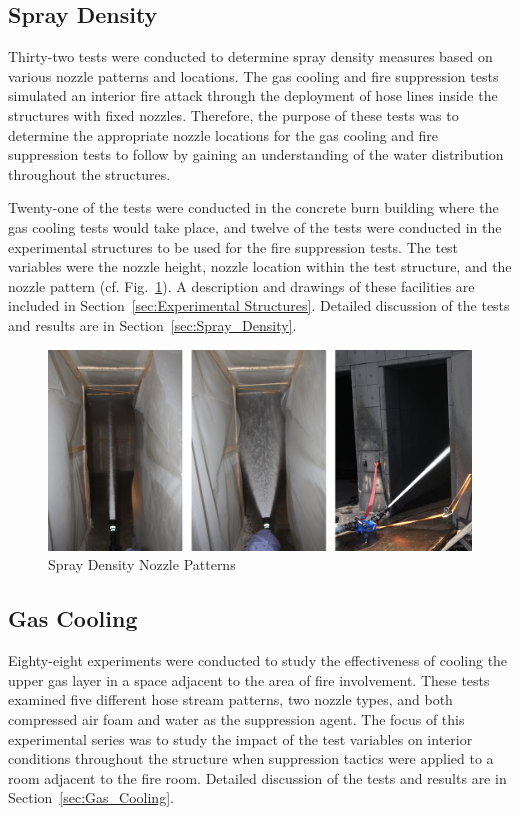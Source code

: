 \documentclass[12pt,oneside]{book}
\begin{document}
\subsection{Spray Density}
\label{sec:desc_Spray_Density}

Thirty-two tests were conducted to determine spray density measures based on various nozzle patterns and locations. The gas cooling and fire suppression tests simulated an interior fire attack through the deployment of hose lines inside the structures with fixed nozzles. Therefore, the purpose of these tests was to determine the appropriate nozzle locations for the gas cooling and fire suppression tests to follow by gaining an understanding of the water distribution throughout the structures.

Twenty-one of the tests were conducted in the concrete burn building where the gas cooling tests would take place, and twelve of the tests were conducted in the experimental structures to be used for the fire suppression tests. The test variables were the nozzle height, nozzle location within the test structure, and the nozzle pattern (cf. Fig.~\ref{fig:Spray_Density_Nozzle_Patterns}). A description and drawings of these facilities are included in Section~\ref{sec:Experimental Structures}. Detailed discussion of the tests and results are in Section~\ref{sec:Spray_Density}.

\begin{figure}[!ht]
	\includegraphics[width=6in]{../Figures/Pictures/Flows}
	\caption{Spray Density Nozzle Patterns}
	\label{fig:Spray_Density_Nozzle_Patterns}
\end{figure}

\subsection{Gas Cooling}
\label{sec:desc_Gas_Cooling}

Eighty-eight experiments were conducted to study the effectiveness of cooling the upper gas layer in a space adjacent to the area of fire involvement. These tests examined five different hose stream patterns, two nozzle types, and both compressed air foam and water as the suppression agent. The focus of this experimental series was to study the impact of the test variables on interior conditions throughout the structure when suppression tactics were applied to a room adjacent to the fire room. Detailed discussion of the tests and results are in Section~\ref{sec:Gas_Cooling}.
\end{document}
